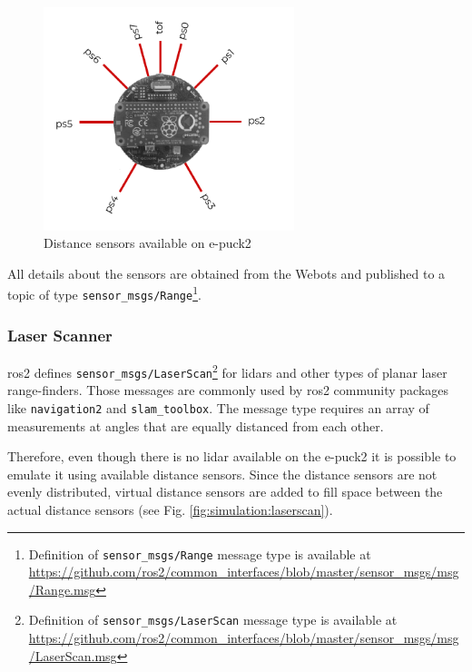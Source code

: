 \begin{figure}[H]
    \centering
    \includegraphics[width=0.65\textwidth]{simulation/figures/distance_sensors.pdf}
    \caption{Distance sensors available on e-puck2}
    \label{fig:simulation:distance_sensors}
\end{figure}

All details about the sensors are obtained from the Webots and published to a topic of type \texttt{sensor\_msgs/Range}\footnote{Definition of \texttt{sensor\_msgs/Range} message type is available at \url{https://github.com/ros2/common_interfaces/blob/master/sensor_msgs/msg/Range.msg}}.

\subsubsection{Laser Scanner}
\ac{ros2} defines \texttt{sensor\_msgs/LaserScan}\footnote{Definition of \texttt{sensor\_msgs/LaserScan} message type is available at \url{https://github.com/ros2/common_interfaces/blob/master/sensor_msgs/msg/LaserScan.msg}} for \acp{lidar} and other types of planar laser range-finders.
Those messages are commonly used by \ac{ros2} community packages like \texttt{navigation2} and \texttt{slam\_toolbox}.
The message type requires an array of measurements at angles that are equally distanced from each other. 

Therefore, even though there is no \ac{lidar} available on the e-puck2 it is possible to emulate it using available distance sensors.
Since the distance sensors are not evenly distributed, virtual distance sensors are added to fill space between the actual distance sensors (see Fig. \ref{fig:simulation:laserscan}).


